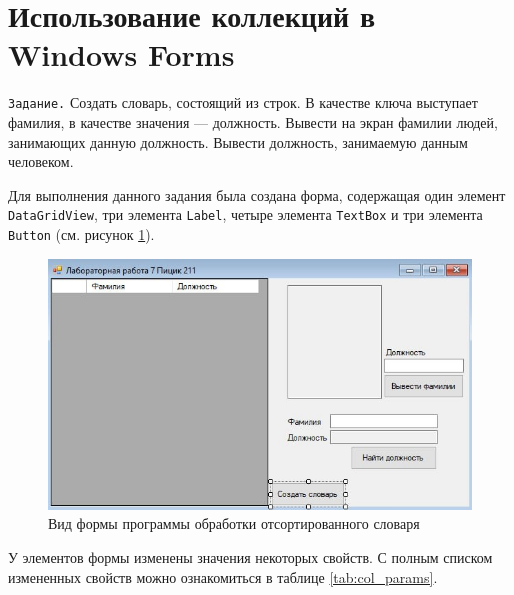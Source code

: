 \section{Использование коллекций в Windows Forms}
\verb|Задание.| Создать словарь, состоящий из строк. В качестве ключа выступает фамилия, 
в качестве значения — должность. Вывести на экран фамилии людей, занимающих данную должность. 
Вывести должность, занимаемую данным человеком.

Для выполнения данного задания была создана форма, содержащая один элемент \verb|DataGridView|, 
три элемента \verb|Label|, четыре элемента \verb|TextBox| и три элемента \verb|Button| (см. рисунок 
\ref{fig:col_form}). 
\begin{figure}[H]
    \centering
    \includegraphics[scale=0.68]{../img/collections/collections_form.png}
    \caption{Вид формы программы обработки отсортированного словаря}
    \label{fig:col_form}
\end{figure}

У элементов формы изменены значения некоторых свойств. С полным списком измененных свойств 
можно ознакомиться в таблице \ref{tab:col_params}.

